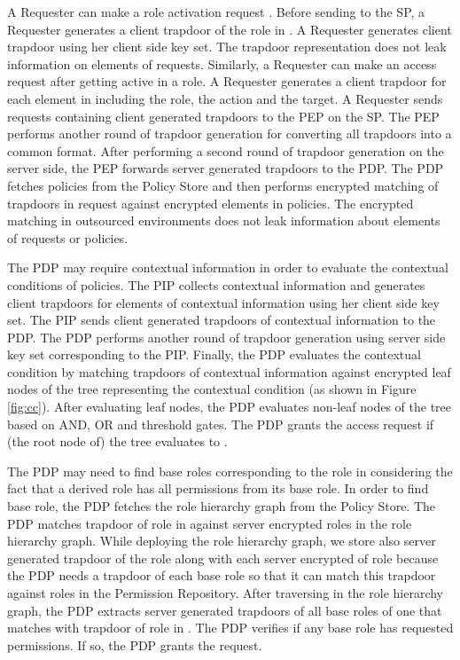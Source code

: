 \documentclass[final,5p,times,twocolumn]{elsarticle}
\begin{document}
A Requester can make a role activation request . Before sending  to the SP, a Requester generates a client trapdoor of the role in . A Requester generates client trapdoor using her client side key set. The trapdoor representation does not leak information on elements of requests. Similarly, a Requester can make an access request  after getting active in a role. A Requester generates a client trapdoor for each element in  including the role, the action and the target. A Requester sends requests containing client generated trapdoors to the PEP on the SP. The PEP performs another round of trapdoor generation for converting all trapdoors into a common format. After performing a second round of trapdoor generation on the server side, the PEP forwards server generated trapdoors to the PDP. The PDP fetches policies from the Policy Store and then performs encrypted matching of trapdoors in request against encrypted elements in policies. The encrypted matching in outsourced environments does not leak information about elements of requests or policies. 

The PDP may require contextual information in order to evaluate the contextual conditions of policies. The PIP collects contextual information and generates client trapdoors for elements of contextual information using her client side key set. The PIP sends client generated trapdoors of contextual information to the PDP. The PDP performs another round of trapdoor generation using server side key set corresponding to the PIP. Finally, the PDP evaluates the contextual condition by matching trapdoors of contextual information against encrypted leaf nodes of the tree representing the contextual condition (as shown in Figure \ref{fig:cc}). After evaluating leaf nodes, the PDP evaluates non-leaf nodes of the tree based on AND, OR and threshold gates. The PDP grants the access request if (the root node of) the tree evaluates to .

The PDP may need to find base roles corresponding to the role in  considering the fact that a derived role has all permissions from its base role. In order to find base role, the PDP fetches the role hierarchy graph from the Policy Store. The PDP matches trapdoor of role in  against server encrypted roles in the role hierarchy graph. While deploying the role hierarchy graph, we store also server generated trapdoor of the role along with each server encrypted of role because the PDP needs a trapdoor of each base role so that it can match this trapdoor against roles in the Permission Repository. After traversing in the role hierarchy graph, the PDP extracts server generated trapdoors of all base roles of one that matches with trapdoor of role in . The PDP verifies if any base role has requested permissions. If so, the PDP grants the request.
\end{document}
